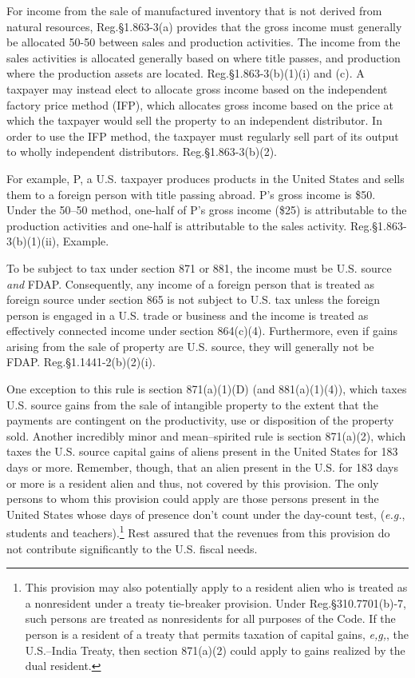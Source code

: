 For income from the sale of manufactured inventory that is not derived from natural resources, Reg.\@ \S 1.863-3(a) provides that the gross income must generally be allocated 50-50 between sales and production activities. The income from the sales activities is allocated generally based on where title passes, and production where the production assets are located.  Reg.\@ \S 1.863-3(b)(1)(i) and (c).  A taxpayer may instead elect to allocate gross income based on the independent factory price method (IFP), which allocates gross income based on the price at which the taxpayer would sell the property to an independent distributor.  In order to use the IFP method, the taxpayer must regularly sell part of its output to wholly independent distributors.  Reg.\@ \S 1.863-3(b)(2).        

For example, P, a U.S. taxpayer produces products in the United States and sells them to a foreign person with title passing abroad.  P's gross income is \$50.  Under the 50--50 method, one-half of P's gross income (\$25) is attributable to the production activities and one-half is attributable to the sales activity.  Reg.\@ \S 1.863-3(b)(1)(ii), Example.

To be subject to tax under section 871 or 881, the income must be U.S. source \emph{and} FDAP.  Consequently, any income of a foreign person that is treated as foreign source under section 865 is not subject to U.S. tax unless the foreign person is engaged in a U.S. trade or business and the income is treated as effectively connected income under section 864(c)(4).  Furthermore, even if gains arising from the sale of property are U.S. source, they will generally not be FDAP.  Reg.\@ \S1.1441-2(b)(2)(i).  

One exception to this rule is section 871(a)(1)(D) (and 881(a)(1)(4)), which taxes U.S. source gains from the sale of intangible property to the extent that the payments are contingent on the productivity, use or disposition of the property sold.  Another incredibly minor and mean--spirited rule is section 871(a)(2), which taxes the U.S. source capital gains of aliens present in the United States for 183 days or more.  Remember, though, that an alien present in the U.S. for 183 days or more is a resident alien and thus, not covered by this provision.  The only persons to whom this provision could apply are those persons present in the United States whose days of presence don't count under the day-count test, (\emph{e.g.}, students and teachers).\footnote{This provision may also potentially apply to a resident alien who is treated as a nonresident under a treaty tie-breaker provision.  Under Reg.\@ \S310.7701(b)-7, such persons are treated as nonresidents for all purposes of the Code.  If the person is a resident of a treaty that permits taxation of capital gains, \emph{e,g,}, the U.S.--India Treaty, then section 871(a)(2) could apply to gains realized by the dual resident.}   Rest assured that the revenues from this provision do not contribute significantly to the U.S. fiscal needs.

